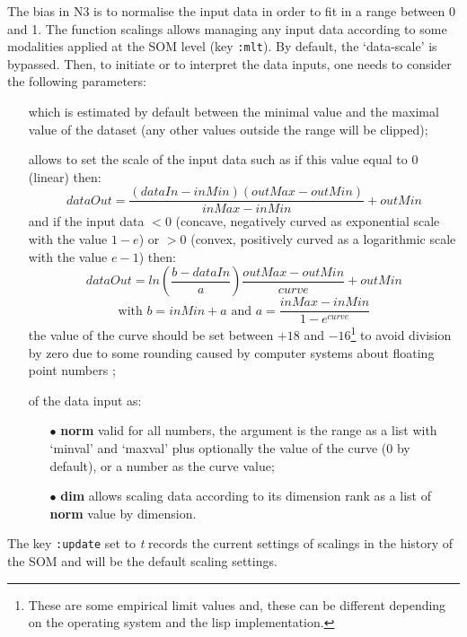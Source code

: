 \bigskip
\bigskip

\label{pt:as}

\bigskip

The bias in N3 is to normalise the input data in order to fit in a range between 0 and 1. The function \glspl{scaling} allows managing any input data according to some modalities applied at the SOM level (key \texttt{:mlt}). By default, the `data-scale' is bypassed. Then, to initiate or to interpret the data inputs, one needs to consider the following parameters:
\begin{itemize}
\item[]  which is estimated by default between the minimal value and the maximal value of the dataset (any other values outside the range will be clipped);
\newpage

\item[]  allows to set the scale of the input data such as if this value equal to 0 (linear) then: 
$$dataOut=\frac{(dataIn-inMin)(outMax-outMin)}{inMax-inMin}+outMin$$
and if the input data $< 0$ (concave, negatively curved as exponential scale with the value $1-e$) or $> 0$ (convex, positively curved as a logarithmic scale with the value $e-1$) then:
$$dataOut=ln\left(\dfrac{b-dataIn}{a}\right)\dfrac{outMax-outMin}{curve}+outMin$$
$$\text{with } b=inMin+a \text{ and }  a=\dfrac{inMax-inMin}{1-e^{curve}}$$ the value of the curve should be set between $+18$ and $-16$\footnote{These are some empirical limit values and, these can be different depending on the operating system and the lisp implementation.} to avoid division by zero due to some rounding caused by computer systems about floating point numbers \citep{re};
\item[]  of the data input as:
\begin{itemize}
\item[$\bullet$] \textbf{norm} valid for all numbers, the argument is the range as a list with `minval' and `maxval' plus optionally the value of the curve (0 by default), or a number as the curve value; %
\item[$\bullet$] \textbf{dim} allows scaling data according to its dimension rank as a list of \textbf{norm} value by dimension.
\end{itemize}
\end{itemize}
The key \texttt{:update} set to \textit{t} records the current settings of \glspl{scaling} in the history of the SOM and will be the default scaling settings. 

